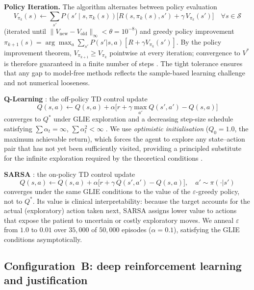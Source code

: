 \documentclass[11pt,a4paper]{article}
\begin{document}
\textbf{Policy Iteration.} The algorithm alternates between policy evaluation
\begin{equation}
  V_{\pi_k}(s) \leftarrow
  \sum_{s'} P\!\left(s' \mid s, \pi_k(s)\right)
  \bigl[R(s,\pi_k(s),s') + \gamma\,V_{\pi_k}(s')\bigr]
  \quad\forall s \in \mathcal{S}
  \label{eq:pe}
\end{equation}
(iterated until $\|V_{\text{new}}-V_{\text{old}}\|_\infty<\theta=10^{-8}$) and
greedy policy improvement
$\pi_{k+1}(s)=\arg\max_a\sum_{s'}P(s'|s,a)[R+\gamma V_{\pi_k}(s')]$.
By the policy improvement theorem, $V_{\pi_{k+1}}\ge V_{\pi_k}$ pointwise at every
iteration; convergence to $V^*$ is therefore guaranteed in a finite number of
steps \cite{sutton2018}. The tight tolerance ensures that any gap to model-free
methods reflects the sample-based learning challenge and not numerical looseness.

\textbf{Q-Learning} \cite{watkins1992}: the off-policy TD control update
\begin{equation}
  Q(s,a) \leftarrow Q(s,a) + \alpha\bigl[r + \gamma\max_{a'}Q(s',a') - Q(s,a)\bigr]
  \label{eq:ql}
\end{equation}
converges to $Q^*$ under GLIE exploration and a decreasing step-size schedule
satisfying $\sum\alpha_t=\infty$, $\sum\alpha_t^2<\infty$ \cite{sutton2018}.
We use \emph{optimistic initialisation} ($Q_0=1.0$, the maximum achievable return),
which forces the agent to explore any state--action pair that has not yet been
sufficiently visited, providing a principled substitute for the infinite exploration
required by the theoretical conditions \cite{sutton2018,ch6}.

\textbf{SARSA} \cite{rummery1994}: the on-policy TD control update
\begin{equation}
  Q(s,a) \leftarrow Q(s,a) + \alpha\bigl[r + \gamma\,Q(s',a') - Q(s,a)\bigr],
  \quad a'\sim\pi(\cdot|s')
  \label{eq:sarsa}
\end{equation}
converges under the same GLIE conditions to the value of the $\varepsilon$-greedy
policy, not to $Q^*$. Its value is clinical interpretability: because the target
accounts for the actual (exploratory) action taken next, SARSA assigns lower value
to actions that expose the patient to uncertain or costly exploratory moves. We
anneal $\varepsilon$ from $1.0$ to $0.01$ over $35{,}000$ of $50{,}000$ episodes
($\alpha=0.1$), satisfying the GLIE conditions asymptotically.

\subsection{Configuration~B: deep reinforcement learning and justification}
\label{sec:methB}
\end{document}
